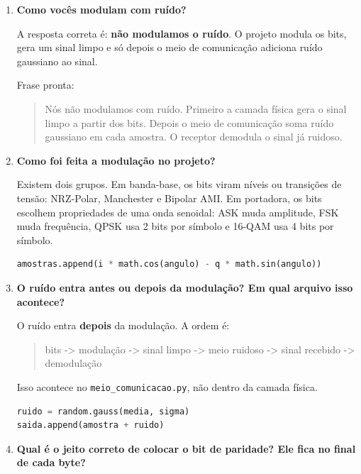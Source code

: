 \documentclass[11pt,a4paper]{article}
\newcommand{\rank}[1]{\textcolor{rankblue}{\textbf{Rank #1}}}
\begin{document}
\begin{enumerate}[leftmargin=1.2cm, itemsep=8pt]
  \item[\rank{1}.] \textbf{Como vocês modulam com ruído?}

  A resposta correta é: \textbf{não modulamos o ruído}. O projeto modula os bits, gera um sinal limpo e só depois o meio de comunicação adiciona ruído gaussiano ao sinal.

  Frase pronta:

  \begin{quote}
  Nós não modulamos com ruído. Primeiro a camada física gera o sinal limpo a partir dos bits. Depois o meio de comunicação soma ruído gaussiano em cada amostra. O receptor demodula o sinal já ruidoso.
  \end{quote}

  \item[\rank{2}.] \textbf{Como foi feita a modulação no projeto?}

  Existem dois grupos. Em banda-base, os bits viram níveis ou transições de tensão: NRZ-Polar, Manchester e Bipolar AMI. Em portadora, os bits escolhem propriedades de uma onda senoidal: ASK muda amplitude, FSK muda frequência, QPSK usa 2 bits por símbolo e 16-QAM usa 4 bits por símbolo.

  \begin{lstlisting}[language=Python]
amostras.append(i * math.cos(angulo) - q * math.sin(angulo))
  \end{lstlisting}

  \item[\rank{3}.] \textbf{O ruído entra antes ou depois da modulação? Em qual arquivo isso acontece?}

  O ruído entra \textbf{depois} da modulação. A ordem é:

  \begin{quote}
  bits -> modulação -> sinal limpo -> meio ruidoso -> sinal recebido -> demodulação
  \end{quote}

  Isso acontece no \texttt{meio\_comunicacao.py}, não dentro da camada física.

  \begin{lstlisting}[language=Python]
ruido = random.gauss(media, sigma)
saida.append(amostra + ruido)
  \end{lstlisting}

  \item[\rank{4}.] \textbf{Qual é o jeito correto de colocar o bit de paridade? Ele fica no final de cada byte?}


\end{enumerate}
\end{document}
